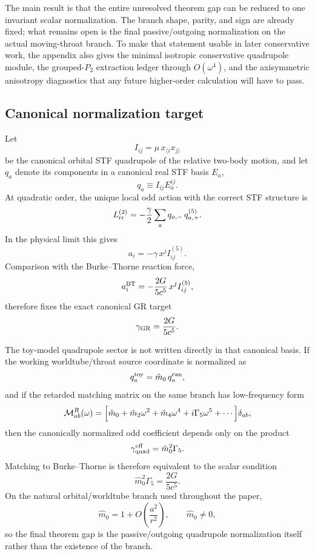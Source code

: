 \documentclass[11pt]{article}
\begin{document}
The main result is that the entire unresolved theorem gap can be reduced to one
invariant scalar normalization.  The branch shape, parity, and sign are already
fixed; what remains open is the final passive/outgoing normalization on the
actual moving-throat branch.  To make that statement usable in later
conservative work, the appendix also gives the minimal isotropic conservative
quadrupole module, the grouped-$P_2$ extraction ledger through $O(\omega^4)$,
and the axisymmetric anisotropy diagnostics that any future higher-order
calculation will have to pass.

\subsection{Canonical normalization target}
\label{app:qnorm-target}

Let
\[
I_{ij}=\mu\,x_{\langle i}x_{j\rangle}
\]
be the canonical orbital STF quadrupole of the relative two-body motion, and
let $q_a$ denote its components in a canonical real STF basis $E_a$,
\[
q_a\equiv I_{ij}E_a^{ij}.
\]
At quadratic order, the unique local odd action with the correct STF structure
is
\[
L_{\rm rr}^{(2)}=-\frac{\gamma}{2}\sum_a q_{a,-}\,q_{a,+}^{(5)}.
\]
In the physical limit this gives
\[
a_i=-\gamma\,x^j I_{ij}^{(5)}.
\]
Comparison with the Burke--Thorne reaction force,
\[
a_i^{\rm BT}=-\frac{2G}{5c^5}\,x^j I_{ij}^{(5)},
\]
therefore fixes the exact canonical GR target
\[
\gamma_{\rm GR}=\frac{2G}{5c^5}.
\]

The toy-model quadrupole sector is not written directly in that canonical basis.
If the working worldtube/throat source coordinate is normalized as
\[
q_a^{\rm toy}=\hat m_0\,q_a^{\rm can},
\]
and if the retarded matching matrix on the same branch has low-frequency form
\[
\mathcal M_{ab}^R(\omega)
=
\Bigl[
\hat m_0+\hat m_2\omega^2+\hat m_4\omega^4+i\Gamma_5\omega^5+\cdots
\Bigr]\delta_{ab},
\]
then the canonically normalized odd coefficient depends only on the product
\[
\gamma_{\rm quad}^{\rm eff}=\hat m_0^2\Gamma_5.
\]
Matching to Burke--Thorne is therefore equivalent to the scalar condition
\begin{equation}
\boxed{
\hat m_0^2\Gamma_5=\frac{2G}{5c^5}.
}
\label{eq:qnorm-bt-target}
\end{equation}
On the natural orbital/worldtube branch used throughout the paper,
\[
\hat m_0=1+O\!\left(\frac{a^2}{r^2}\right),
\qquad
\hat m_0\neq0,
\]
so the final theorem gap is the passive/outgoing quadrupole normalization
itself rather than the existence of the branch.
\end{document}
